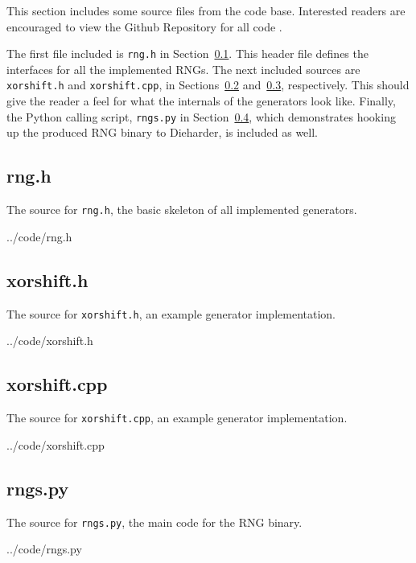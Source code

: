 This section includes some source files from the code base. Interested readers are encouraged to view the Github Repository for all code \cite{github_repo}.

The first file included is \texttt{rng.h} in Section~\ref{sec:rng_h}. This header file defines the interfaces for all the implemented RNGs. The next included sources are \texttt{xorshift.h} and \texttt{xorshift.cpp}, in Sections~\ref{sec:xorshift_h} and~\ref{sec:xorshift_cpp}, respectively. This should give the reader a feel for what the internals of the generators look like. Finally, the Python calling script, \texttt{rngs.py} in Section~\ref{sec:rngs_py}, which demonstrates hooking up the produced RNG binary to Dieharder, is included as well.

\subsection{rng.h}
\label{sec:rng_h}
The source for \texttt{rng.h}, the basic skeleton of all implemented generators.

    {../code/rng.h}

\newpage
\subsection{xorshift.h}
\label{sec:xorshift_h}
The source for \texttt{xorshift.h}, an example generator implementation.

    {../code/xorshift.h}

\newpage
\subsection{xorshift.cpp}
\label{sec:xorshift_cpp}
The source for \texttt{xorshift.cpp}, an example generator implementation.

    {../code/xorshift.cpp}

\newpage
\subsection{rngs.py}
\label{sec:rngs_py}
The source for \texttt{rngs.py}, the main code for the RNG binary.

    {../code/rngs.py}

